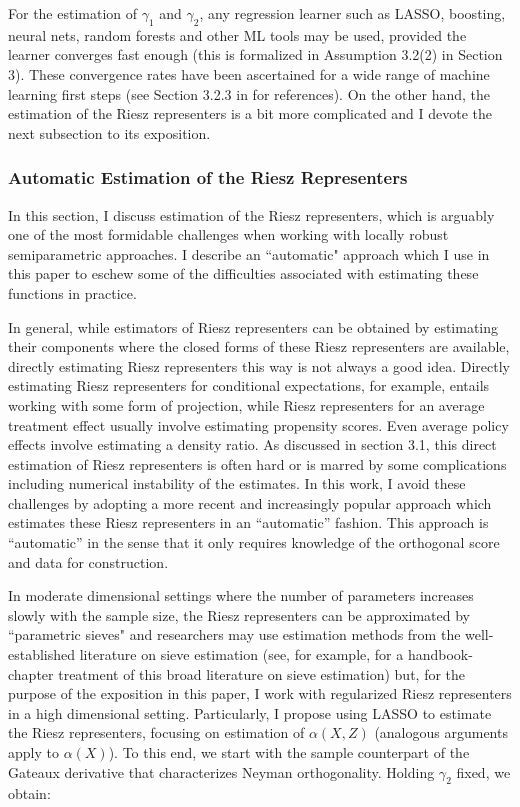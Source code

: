 For the estimation of $\gamma_1$ and $\gamma_2$, any regression learner such as LASSO, boosting, neural nets, random forests and other ML tools may be used, provided the learner converges fast enough (this is formalized in Assumption 3.2(2) in Section 3). These convergence rates have been ascertained for a wide range of machine learning first steps (see Section 3.2.3 in \citet{chernozhukov2024automatic} for references). On the other hand, the estimation of the Riesz representers is a bit more complicated and I devote the next subsection to its exposition.

\subsubsection{Automatic Estimation of the Riesz Representers}
In this section, I discuss estimation of the Riesz representers, which is arguably one of the most formidable challenges when working with locally robust semiparametric approaches. I describe an ``automatic" approach which I use in this paper to eschew some of the difficulties associated with estimating these functions in practice. 

In general, while estimators of Riesz representers can be obtained by estimating their components where the closed forms of these Riesz representers are available, directly estimating Riesz representers this way is not always a good idea. Directly estimating Riesz representers for conditional expectations, for example, entails working with some form of projection, while Riesz representers for an average treatment effect usually involve estimating propensity scores. Even average policy effects involve estimating a density ratio. As discussed in section 3.1, this direct estimation of Riesz representers is often hard or is marred by some complications including numerical instability of the estimates. In this work, I avoid these challenges by adopting a more recent and increasingly popular approach which estimates these Riesz representers in an \enquote{automatic} fashion. This approach is \enquote{automatic} in the sense that it only requires knowledge of the orthogonal score and data for construction.

In moderate dimensional settings where the number of parameters increases slowly with the sample size, the Riesz representers can be approximated by ``parametric sieves" and researchers may use estimation methods from the well-established literature on sieve estimation (see, for example, \citet{CHEN20075549} for a handbook-chapter treatment of  this broad literature on sieve estimation) but, for the purpose of the exposition in this paper, I work with regularized Riesz representers in a high dimensional setting. Particularly, I propose using LASSO to estimate the Riesz representers, focusing on estimation of $\alpha(X,Z)$ (analogous arguments apply to $\alpha(X)$). To this end, we start with the sample counterpart of the Gateaux derivative that characterizes Neyman orthogonality.  Holding $\gamma_2$ fixed, we obtain:

